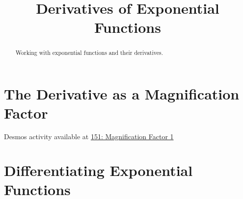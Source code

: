 \documentclass{ximera}
\title{Derivatives of Exponential Functions}
\begin{document}
\begin{abstract}
Working with exponential functions and their derivatives.
\end{abstract}
\maketitle



\section*{The Derivative as a Magnification Factor}
\begin{exploration}   \label{Ex:325gyt}

\begin{onlineOnly}
    \begin{center}
\end{center}
\end{onlineOnly}


Desmos activity available at \href{https://www.desmos.com/calculator/avojxkic0r}{151: Magnification Factor 1}

\end{exploration}


\section*{Differentiating Exponential Functions}
\end{document}
